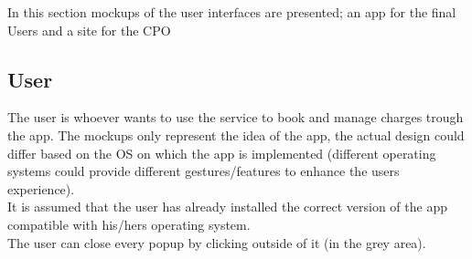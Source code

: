 In this section mockups of the user interfaces are presented; an app for the final Users and a site for the \acs{CPO}\\
\subsection{User}
The user is whoever wants to use the service to book and manage charges trough the app. The mockups only represent the idea of the app, the actual design could differ based on the OS on which the app is implemented (different operating systems could provide different gestures/features to enhance the users experience).\\
It is assumed that the user has already installed the correct version of the app compatible with his/hers operating system.\\
The user can close every popup by clicking outside of it (in the grey area).
